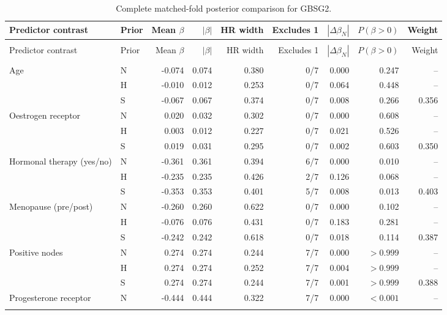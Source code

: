 \begingroup\singlespacing\footnotesize
\setlength{\tabcolsep}{3pt}
\setlength{\LTcapwidth}{\textwidth}
\begin{longtable}{@{}>{\raggedright\arraybackslash}p{}lrrrrrrr@{}}
\caption{Complete matched-fold posterior comparison for GBSG2.}\label{tab:posterior-all-gbsg2}\\
\toprule
Predictor contrast & Prior & Mean $\beta$ & $|\beta|$ & HR width & Excludes 1 & $|\Delta\beta_N|$ & $P(\beta>0)$ & Weight\\
\midrule\endfirsthead
\multicolumn{9}{l}{\tablename\ \thetable\ (continued)}\\
\toprule
Predictor contrast & Prior & Mean $\beta$ & $|\beta|$ & HR width & Excludes 1 & $|\Delta\beta_N|$ & $P(\beta>0)$ & Weight\\
\midrule\endhead
\midrule
\multicolumn{9}{r}{Continued on next page}\\\endfoot
\bottomrule\endlastfoot
Age & N & -0.074 & 0.074 & 0.380 & 0/7 & 0.000 & 0.247 & --\\*
 & H & -0.010 & 0.012 & 0.253 & 0/7 & 0.064 & 0.448 & --\\*
 & S & -0.067 & 0.067 & 0.374 & 0/7 & 0.008 & 0.266 & 0.356\\[2pt]
Oestrogen receptor & N & 0.020 & 0.032 & 0.302 & 0/7 & 0.000 & 0.608 & --\\*
 & H & 0.003 & 0.012 & 0.227 & 0/7 & 0.021 & 0.526 & --\\*
 & S & 0.019 & 0.031 & 0.295 & 0/7 & 0.002 & 0.603 & 0.350\\[2pt]
Hormonal therapy (yes/no) & N & -0.361 & 0.361 & 0.394 & 6/7 & 0.000 & 0.010 & --\\*
 & H & -0.235 & 0.235 & 0.426 & 2/7 & 0.126 & 0.068 & --\\*
 & S & -0.353 & 0.353 & 0.401 & 5/7 & 0.008 & 0.013 & 0.403\\[2pt]
Menopause (pre/post) & N & -0.260 & 0.260 & 0.622 & 0/7 & 0.000 & 0.102 & --\\*
 & H & -0.076 & 0.076 & 0.431 & 0/7 & 0.183 & 0.281 & --\\*
 & S & -0.242 & 0.242 & 0.618 & 0/7 & 0.018 & 0.114 & 0.387\\[2pt]
Positive nodes & N & 0.274 & 0.274 & 0.244 & 7/7 & 0.000 & $>0.999$ & --\\*
 & H & 0.274 & 0.274 & 0.252 & 7/7 & 0.004 & $>0.999$ & --\\*
 & S & 0.274 & 0.274 & 0.244 & 7/7 & 0.001 & $>0.999$ & 0.388\\[2pt]
Progesterone receptor & N & -0.444 & 0.444 & 0.322 & 7/7 & 0.000 & $<0.001$ & --\\*

\end{longtable}
